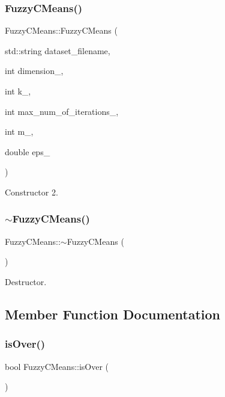 \subsubsection{\texorpdfstring{Fuzzy\+C\+Means()}{FuzzyCMeans()}\hspace{0.1cm}{\footnotesize\ttfamily [2/2]}}
{\footnotesize\ttfamily Fuzzy\+C\+Means\+::\+Fuzzy\+C\+Means (\begin{DoxyParamCaption}\item[{std\+::string}]{dataset\+\_\+filename,  }\item[{int}]{dimension\+\_\+,  }\item[{int}]{k\+\_\+,  }\item[{int}]{max\+\_\+num\+\_\+of\+\_\+iterations\+\_\+,  }\item[{int}]{m\+\_\+,  }\item[{double}]{eps\+\_\+ }\end{DoxyParamCaption})}

Constructor 2. \mbox{\label{class_fuzzy_c_means_ae3175d6a98d93d476c37da164252f7de}} 
\subsubsection{\texorpdfstring{$\sim$\+Fuzzy\+C\+Means()}{~FuzzyCMeans()}}
{\footnotesize\ttfamily Fuzzy\+C\+Means\+::$\sim$\+Fuzzy\+C\+Means (\begin{DoxyParamCaption}{ }\end{DoxyParamCaption})}

Destructor. 

\subsection{Member Function Documentation}
\mbox{\label{class_fuzzy_c_means_acd89ddb387a57ddc8838ed29c9ec31bd}} 
\subsubsection{\texorpdfstring{is\+Over()}{isOver()}}
{\footnotesize\ttfamily bool Fuzzy\+C\+Means\+::is\+Over (\begin{DoxyParamCaption}{ }\end{DoxyParamCaption})}


